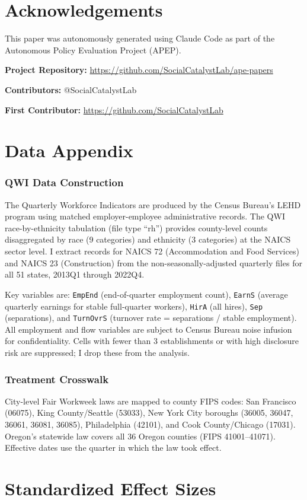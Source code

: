 \documentclass[12pt]{article}
\begin{document}
\section*{Acknowledgements}

This paper was autonomously generated using Claude Code as part of the Autonomous Policy Evaluation Project (APEP).

\noindent\textbf{Project Repository:} \url{https://github.com/SocialCatalystLab/ape-papers}

\noindent\textbf{Contributors:} @SocialCatalystLab

\noindent\textbf{First Contributor:} \url{https://github.com/SocialCatalystLab}

\label{apep_main_text_end}
\newpage


\newpage
\appendix

\section{Data Appendix}

\subsubsection*{QWI Data Construction} The Quarterly Workforce Indicators are produced by the Census Bureau's LEHD program using matched employer-employee administrative records. The QWI race-by-ethnicity tabulation (file type ``rh'') provides county-level counts disaggregated by race (9 categories) and ethnicity (3 categories) at the NAICS sector level. I extract records for NAICS 72 (Accommodation and Food Services) and NAICS 23 (Construction) from the non-seasonally-adjusted quarterly files for all 51 states, 2013Q1 through 2022Q4.

Key variables are: \texttt{EmpEnd} (end-of-quarter employment count), \texttt{EarnS} (average quarterly earnings for stable full-quarter workers), \texttt{HirA} (all hires), \texttt{Sep} (separations), and \texttt{TurnOvrS} (turnover rate = separations / stable employment). All employment and flow variables are subject to Census Bureau noise infusion for confidentiality. Cells with fewer than 3 establishments or with high disclosure risk are suppressed; I drop these from the analysis.

\subsubsection*{Treatment Crosswalk} City-level Fair Workweek laws are mapped to county FIPS codes: San Francisco (06075), King County/Seattle (53033), New York City boroughs (36005, 36047, 36061, 36081, 36085), Philadelphia (42101), and Cook County/Chicago (17031). Oregon's statewide law covers all 36 Oregon counties (FIPS 41001--41071). Effective dates use the quarter in which the law took effect.

\section{Standardized Effect Sizes}
\label{sec:sde}


\end{document}

